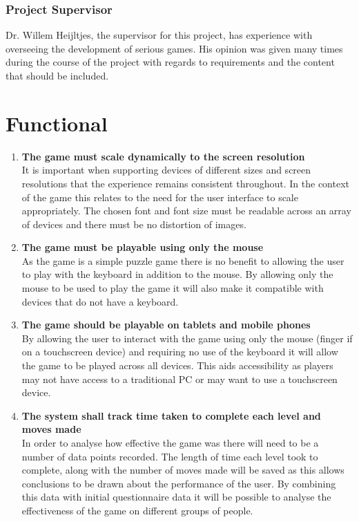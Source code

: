 \documentclass[12pt,a4paper]{report}
\begin{document}
\subsubsection{Project Supervisor}
Dr. Willem Heijltjes, the supervisor for this project, has experience with overseeing the development of serious games. His opinion was given many times during the course of the project with regards to requirements and the content that should be included.

 \section{Functional}
   \begin{enumerate}[label*=\arabic*]
   
   
   
   
            \item \textbf{The game must scale dynamically to the screen resolution}\\
It is important when supporting devices of different sizes and screen resolutions that the experience remains consistent throughout. In the context of the game this relates to the need for the user interface to scale appropriately. The chosen font and font size must be readable across an array of devices and there must be no distortion of images.


            \item \textbf{The game must be playable using only the mouse}\\
As the game is a simple puzzle game there is no benefit to allowing the user to play with the keyboard in addition to the mouse. By allowing only the mouse to be used to play the game it will also make it compatible with devices that do not have a keyboard.

 \item \textbf{The game should be playable on tablets and mobile phones}\\
By allowing the user to interact with the game using only the mouse (finger if on a touchscreen device) and requiring no use of the keyboard it will allow the game to be played across all devices. This aids accessibility as players may not have access to a traditional PC or may want to use a touchscreen device.	

            	  \item \textbf{The system shall track time taken to complete each level and moves made}\\
In order to analyse how effective the game was there will need to be a number of data points recorded. The length of time each level took to complete, along with the number of moves made will be saved as this allows conclusions to be drawn about the performance of the user. By combining this data with initial questionnaire data it will be possible to analyse the effectiveness of the game on different groups of people.
            

\end{enumerate}
\end{document}

